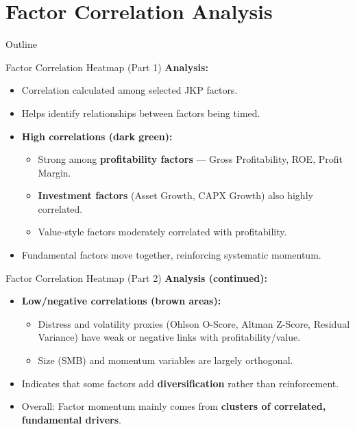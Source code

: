 \documentclass[t]{beamer}
\begin{document}
\section{Factor Correlation Analysis}

\begin{frame}{Outline}
\end{frame}

\begin{frame}{Factor Correlation Heatmap (Part 1)}
\textbf{Analysis:}
\begin{itemize}
    \item Correlation calculated among selected JKP factors.
    \item Helps identify relationships between factors being timed.
    \item \textbf{High correlations (dark green):}
    \begin{itemize}
        \item Strong among \textbf{profitability factors} — Gross Profitability, ROE, Profit Margin.
        \item \textbf{Investment factors} (Asset Growth, CAPX Growth) also highly correlated.
        \item Value-style factors moderately correlated with profitability.
    \end{itemize}
    \item Fundamental factors move together, reinforcing systematic momentum.
\end{itemize}
\end{frame}

\begin{frame}{Factor Correlation Heatmap (Part 2)}
\textbf{Analysis (continued):}
\begin{itemize}
    \item \textbf{Low/negative correlations (brown areas):}
    \begin{itemize}
        \item Distress and volatility proxies (Ohlson O-Score, Altman Z-Score, Residual Variance) have weak or negative links with profitability/value.
        \item Size (SMB) and momentum variables are largely orthogonal.
    \end{itemize}
    \item Indicates that some factors add \textbf{diversification} rather than reinforcement.
    \item Overall: Factor momentum mainly comes from \textbf{clusters of correlated, fundamental drivers}.
\end{itemize}
\end{frame}
\end{document}
